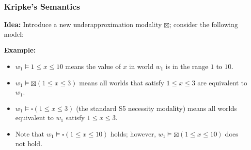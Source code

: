 \begin{frame}[fragile]
    \frametitle{Kripke's Semantics}

\textbf{Idea:} Introduce a new underapproximation modality $\boxtimes$; consider the following model:


\textbf{Example:} 
\begin{itemize}
    \item $w_1 \models 1 \leq x \leq 10$ means the value of $x$ in world $w_1$ is in the range $1$ to $10$.
    \item $w_1 \models \boxtimes (1 \leq x \leq 3)$ means all worlds that satisfy $1 \leq x \leq 3$ are equivalent to $w_1$.
    \item $w_1 \models \square (1 \leq x \leq 3)$ (the standard S5 necessity modality) means all worlds equivalent to $w_1$ satisfy $1 \leq x \leq 3$.
    \item Note that $w_1 \models \square (1 \leq x \leq 10)$ holds; however, $w_1 \models \boxtimes (1 \leq x \leq 10)$ does not hold.
\end{itemize}
 
\end{frame}

